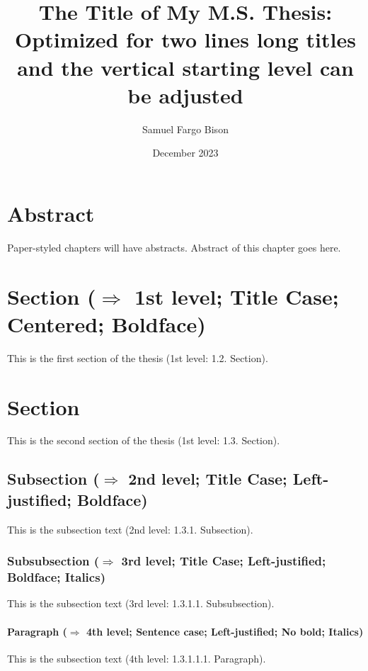 \documentclass[ms-thesis,mathdesign,12pt]{ndsu-thesis-2022}
\title{The Title of My M.S. Thesis: Optimized for two lines long titles and the vertical starting level can be adjusted}
\author{Samuel Fargo Bison}
\date{December 2023}
\begin{document}

\section{Abstract}
Paper-styled chapters will have abstracts. Abstract of this chapter goes here. \kant[1]

\section{Section ($\Rightarrow$ 1st level; Title Case; Centered; Boldface)}
This is the first section of the thesis (1st level: 1.2. Section). \kant[2]

\section{Section}
This is the second section of the thesis (1st level: 1.3. Section). \kant[3]

\subsection{Subsection ($\Rightarrow$ 2nd level; Title Case; Left-justified; Boldface)}
This is the subsection text (2nd level: 1.3.1. Subsection). \kant[4]

\subsubsection{Subsubsection ($\Rightarrow$ 3rd level; Title Case; Left-justified; Boldface; Italics)}
This is the subsection text (3rd level: 1.3.1.1. Subsubsection). \kant[5]

\paragraph{Paragraph ($\Rightarrow$ 4th level; Sentence case; Left-justified; No bold; Italics)}
This is the subsection text (4th level: 1.3.1.1.1. Paragraph). \kant[6]
\end{document}
